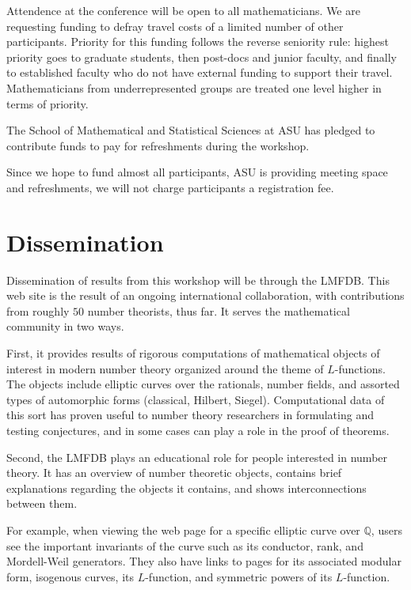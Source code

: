 \documentclass[12pt]{amsart}
\numberwithin{equation}{section}
\newcommand{\Q}{\mathbb Q}
\begin{document}
Attendence at the conference will be open to all mathematicians.  We
are requesting funding to defray travel costs of a limited number of
other participants.  Priority for this funding follows the reverse
seniority rule: highest priority goes to graduate students, then
post-docs and junior faculty, and finally to established faculty who
do not have external funding to support their travel.  Mathematicians
from underrepresented groups are treated one level higher in terms of
priority.


The School of Mathematical and Statistical Sciences at ASU has pledged to
contribute funds to pay for refreshments during the workshop.

Since we hope to fund almost all participants, ASU is providing
meeting space and refreshments, we will not charge participants a
registration fee.


\section{Dissemination}

Dissemination of results from this workshop will be through the
\textsf{LMFDB}.  This web site is the result of an ongoing international
collaboration, with contributions from roughly $50$ number theorists,
thus far.  It serves the mathematical community in two ways.

First, it provides results of rigorous computations of mathematical
objects of interest in modern number theory organized around the theme
of $L$-functions.  The objects include elliptic curves over the
rationals, number fields, and assorted types of automorphic forms
(classical, Hilbert, Siegel).  Computational data of this sort has
proven useful to number theory researchers in formulating and testing
conjectures, and in some cases can play a role in the proof of
theorems.

Second, the \textsf{LMFDB} plays an educational role for people interested in
number theory.  It has an overview of number theoretic objects,
contains brief explanations regarding the objects it contains, and
shows interconnections between them.  

For example, when viewing the web page for a specific elliptic curve
over $\Q$, users see the important invariants of the curve such as its
conductor, rank, and Mordell-Weil generators.  They also have links to
pages for its associated modular form, isogenous curves, its
$L$-function, and symmetric powers of its $L$-function.
\end{document}

